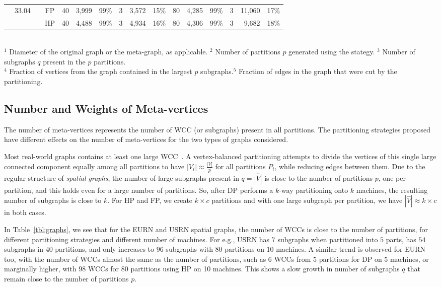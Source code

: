 \documentclass[10pt,conference, compsocconf]{IEEEtran}
\begin{document}
\begin{table*}[t]
\begin{tabular}{p{.8cm}|r|r||c||r|r|r|r|r|r||r|r|r|r|r|r}
       & 33.04 & & FP &  40& 3,999& 99\%& 3& 3,572& 15\%&  80& 4,285& 99\%& 3& 11,060& 17\%\\
               &&& HP &  40& 4,488& 99\%& 3& 4,934& 16\%&  80& 4,306& 99\%& 3& 9,682& 18\%\\
\hline 
\end{tabular}
\\ $^1$ Diameter of the original graph or the meta-graph, as applicable.  \quad  $^2$ Number of partitions $p$ generated using the stategy. \quad  $^3$ Number of subgraphs $q$ present in the $p$ partitions.
\\$^4$ Fraction of vertices from the graph contained in the largest $p$ subgraphs.\qquad\qquad  $^5$ Fraction of edges in the graph that were cut by the partitioning.
\label{tbl:graphs}
\end{table*}



\subsection{Number and Weights of Meta-vertices} 
The number of meta-vertices represents the number of WCC (or subgraphs) present in all partitions. The partitioning strategies proposed have different effects on the number of meta-vertices for the two types of graphs considered.


Most real-world graphs contains at least one large WCC~\cite{faloutsos}. A vertex-balanced partitioning attempts to divide the vertices of this single large connected component equally among all partitions to have $|V_i| \approx \frac{|V|}{p}$ for all partitions $P_i$, while reducing edges between them. Due to the regular structure of \emph{spatial graphs}, the number of large subgraphs present in $q=|\widehat{V}|$ is close to the number of partitions $p$, one per partition, and this holds even for a large number of partitions. So, after DP performs a $k$-way partitioning onto $k$ machines, the resulting number of subgraphs is close to $k$. For HP and FP, we create $k \times c$ partitions and with one large subgraph per partition, we have $|\widehat{V}| \approx k \times c$ in both cases.


In Table~\ref{tbl:graphs}, we see that for the EURN and USRN spatial graphs, the number of WCCs is close to the number of partitions, for different partitioning strategies and different number of machines. For e.g., USRN has $7$ subgraphs when partitioned into $5$ parts, has $54$ subgraphs in $40$ partitions, and only increases to $96$ subgraphs with $80$ partitions on $10$ machines. A similar trend is observed for EURN too, with the number of WCCs almost the same as the number of partitions, such as $6$ WCCs from $5$ partitions for DP on 5 machines, or marginally higher, with $98$ WCCs for $80$ partitions using HP on 10 machines. This shows a slow growth in number of subgraphs $q$ that remain close to the number of partitions $p$. 
\end{document}
